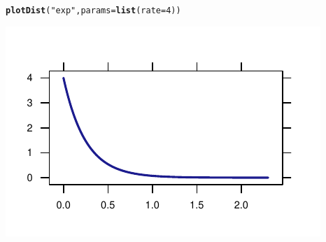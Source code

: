 \documentclass[twoside]{book}\usepackage[]{graphicx}\usepackage[]{xcolor}
\makeatletter
\def\maxwidth{ %
  \ifdim\Gin@nat@width>\linewidth
    \linewidth
  \else
    \Gin@nat@width
  \fi
}
\newcommand{\hlnum}[1]{\textcolor[rgb]{0.686,0.059,0.569}{#1}}%
\newcommand{\hlstr}[1]{\textcolor[rgb]{0.192,0.494,0.8}{#1}}%
\newcommand{\hlstd}[1]{\textcolor[rgb]{0.345,0.345,0.345}{#1}}%
\newcommand{\hlkwc}[1]{\textcolor[rgb]{0.333,0.667,0.333}{#1}}%
\newcommand{\hlkwd}[1]{\textcolor[rgb]{0.737,0.353,0.396}{\textbf{#1}}}%
\newenvironment{kframe}{%
 \def\at@end@of@kframe{}%
 \ifinner\ifhmode%
  \def\at@end@of@kframe{\end{minipage}}%
  \begin{minipage}{\columnwidth}%
 \fi\fi%
 \def\FrameCommand##1{\hskip\@totalleftmargin \hskip-\fboxsep
 \colorbox{shadecolor}{##1}\hskip-\fboxsep
     \hskip-\linewidth \hskip-\@totalleftmargin \hskip\columnwidth}%
 \MakeFramed {\advance\hsize-\width
   \@totalleftmargin\z@ \linewidth\hsize
   \@setminipage}}%
 {\par\unskip\endMakeFramed%
 \at@end@of@kframe}
\newenvironment{knitrout}{}{} %
\newlength{\tempfmlength}
\newenvironment{fmpage}[1]
     {
	 \medskip
	 \setlength{\tempfmlength}{#1}
	 \begin{lrbox}{\fmbox}
	   \begin{minipage}{#1}
		 \vspace*{.02\tempfmlength}
		 \hfill
	   \begin{minipage}{.95 \tempfmlength}}
		 {\end{minipage}\hfill
		 \vspace*{.015\tempfmlength}
		 \end{minipage}\end{lrbox}\fbox{\usebox{\fmbox}}
	 \medskip
	 }
\newenvironment{boxedText}[1][.98\textwidth]%
{%
\begin{center}
\begin{fmpage}{#1}
}%
{%
\end{fmpage}
\end{center}
}
\makeatother
\begin{document}

\begin{knitrout}
\color{fgcolor}\begin{kframe}
\begin{alltt}
\hlkwd{plotDist}\hlstd{(}\hlstr{"exp"}\hlstd{,} \hlkwc{params} \hlstd{=} \hlkwd{list}\hlstd{(}\hlkwc{rate} \hlstd{=} \hlnum{4}\hlstd{))}
\end{alltt}
\end{kframe}

{\centering \includegraphics[width=\maxwidth]{figures/fig-plotDist-eponential-1} 

}



\end{knitrout}
\end{document}

